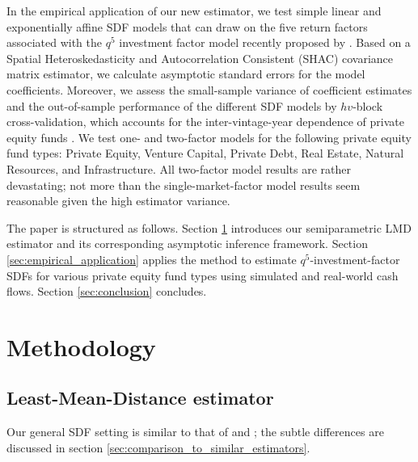\documentclass[12pt]{article}
\begin{document}
In the empirical application of our new estimator, we test simple linear and exponentially affine SDF models that can draw on the five return factors associated with the $q^5$ investment factor model recently proposed by \cite{HXZ20}.
Based on a Spatial Heteroskedasticity and Autocorrelation Consistent (SHAC) covariance matrix estimator, we calculate asymptotic standard errors for the model coefficients.
Moreover, we assess the small-sample variance of coefficient estimates and the out-of-sample performance of the different SDF models by $hv$-block cross-validation, which accounts for the inter-vintage-year dependence of private equity funds \citep{R00}.
We test one- and two-factor models for the following private equity fund types: Private Equity, Venture Capital, Private Debt, Real Estate, Natural Resources, and Infrastructure.
All two-factor model results are rather devastating; not more than the single-market-factor model results seem reasonable given the high estimator variance.

The paper is structured as follows. 
Section \ref{sec:Methodology} introduces our semiparametric LMD estimator and its corresponding asymptotic inference framework.
Section \ref{sec:empirical_application} applies the method to estimate $q^5$-investment-factor SDFs for various private equity fund types using simulated and real-world cash flows.
Section \ref{sec:conclusion} concludes.


\section{Methodology}
\label{sec:Methodology}

\subsection{Least-Mean-Distance estimator}
\label{sec:fundwise_lmd_estimator}

Our general SDF setting is similar to that of \cite{DLP12} and \cite{KN16}; the subtle differences are discussed in section \ref{sec:comparison_to_similar_estimators}.
\end{document}
